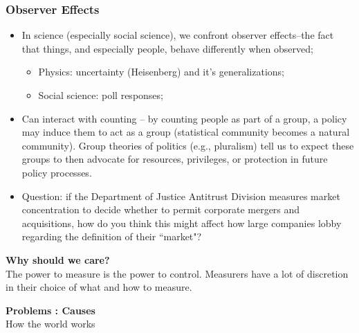 \documentclass[aspectratio=169]{beamer}
\theoremstyle{principle}
\begin{document}
\begin{frame}
\frametitle{Observer Effects}
\begin{itemize}
\item In science (especially social science), we confront observer effects–the fact that things, and especially people, behave differently when observed;
\begin{itemize}
\item Physics: uncertainty (Heisenberg) and it's generalizations;
\item Social science: poll responses;
\end{itemize}
\bigskip
\item Can interact with counting -- by counting people as part of a group, a policy may induce them to act as a group (statistical community becomes a natural community). Group theories of politics (e.g., pluralism) tell us to expect these groups to then advocate for resources, privileges, or protection in future policy processes.
\bigskip
\item Question: if the Department of Justice Antitrust Division measures market concentration to decide whether to permit corporate mergers and acquisitions, how do you think this might affect how large companies lobby regarding the definition of their ``market"?
\end{itemize}
\end{frame}

\begin{frame}

\begin{center}
\Huge\textbf{Why should we care?}\\
\bigskip
\bigskip
\large The power to measure is the power to control.  Measurers have a lot of discretion in their choice of what and how to measure.\\
\end{center}

\end{frame}

\begin{frame}

\begin{center}
\Huge\textbf{Problems : Causes}\\
\bigskip
\bigskip
\large How the world works
\end{center}

\end{frame}
\end{document}

